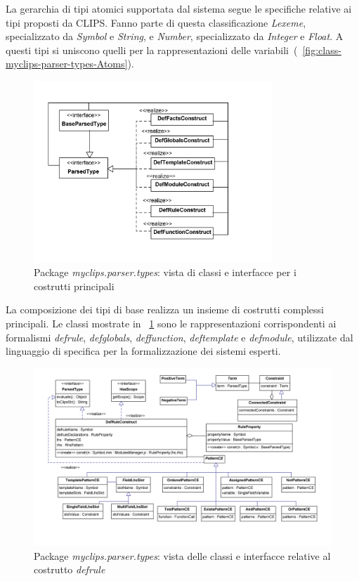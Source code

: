 La gerarchia di tipi atomici supportata dal sistema segue le specifiche relative ai tipi proposti da CLIPS. Fanno parte di questa classificazione \emph{Lexeme}, specializzato da \emph{Symbol} e \emph{String}, e \emph{Number}, specializzato da \emph{Integer} e \emph{Float}. A questi tipi si uniscono quelli per la rappresentazioni delle variabili~(\figurename~\ref{fig:class-myclips-parser-types-Atoms}).

\begin{figure}[h]
\centering
\includegraphics[width=0.8\textwidth]{Immagini/Capitolo3/Classi/myclips_parser_types_Constructs.png}
\caption{Package \emph{myclips.parser.types}: vista di classi e interfacce per i costrutti principali}\label{fig:class-myclips-parser-types-Constructs}
\end{figure}

La composizione dei tipi di base realizza un insieme di costrutti complessi principali. Le classi mostrate in \figurename~\ref{fig:class-myclips-parser-types-Constructs} sono le rappresentazioni corrispondenti ai formalismi \emph{defrule}, \emph{defglobals}, \emph{deffunction}, \emph{deftemplate} e \emph{defmodule}, utilizzate dal linguaggio di specifica per la formalizzazione dei sistemi esperti.

\begin{figure}[h]
\centering
\includegraphics[width=1\textwidth]{Immagini/Capitolo3/Classi/myclips_parser_types_DefRule.png}
\caption{Package \emph{myclips.parser.types}: vista delle classi e interfacce relative al costrutto \emph{defrule}}\label{fig:class-myclips-parser-types-DefRuleConstruct}
\end{figure}

